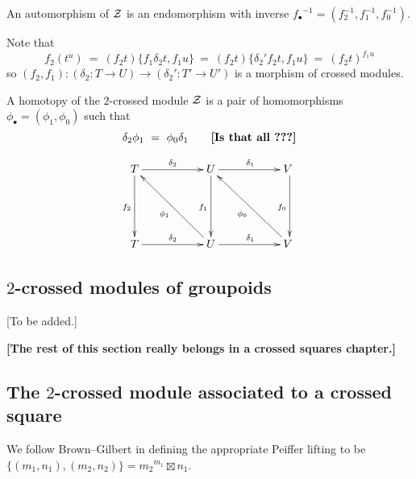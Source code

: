 \noindent
An automorphism of $\mathcal{Z}$ is an endomorphism with inverse
${f_{\bullet}}^{-1} = (f_2^{-1},f_1^{-1},f_0^{-1})$.

Note that
$$
f_2(t^u) ~=~ (f_2t)\{f_1\delta_2t,f_1u\}
         ~=~ (f_2t)\{\delta_2'f_2t,f_1u\}
         ~=~ (f_2t)^{f_1u}
$$
so $(f_2,f_1) : (\delta_2 : T \to U) \to (\delta_2' : T' \to U')$ 
is a morphism of crossed modules.

\begin{defn} 
A homotopy of the $2$-crossed module $\mathcal{Z}$
is a pair of homomorphisms $\phi_{\bullet} = (\phi_1,\phi_0)$
such that 
$$
\delta_2\phi_1 ~=~ \phi_0\delta_1 \qquad\mbox{{\bf [Is that all~???]}}
$$
\end{defn}
$$
\xymatrix{
    T \ar[rr]^{\delta_2} \ar[dd]_{f_2}
    &&  U \ar[rr]^{\delta_1} \ar[dd]_{f_1}
        && V~ \ar[dd]_{f_0} \\
    &&  &&  \\
    T \ar[rr]^{\delta_2} 
    &&  U \ar[rr]^{\delta_1} \ar[lluu]^{\phi_1}
        && V~ \ar[lluu]^{\phi_0}  \\
}
$$



\subsection{$2$-crossed modules of groupoids}  \label{subsec:2xmod-gpd}

[To be added.]





\newpage
\begin{center}
{\bf [The rest of this section really belongs in a crossed squares chapter.]}
\end{center}

\subsection{The $2$-crossed module associated to a crossed square}

We follow Brown--Gilbert \cite{brow:gilb} in defining the appropriate 
Peiffer lifting to be 
$\{(m_1, n_1),(m_2,n_2) \} = {m_2}^{m_1} \boxtimes n_1$.

